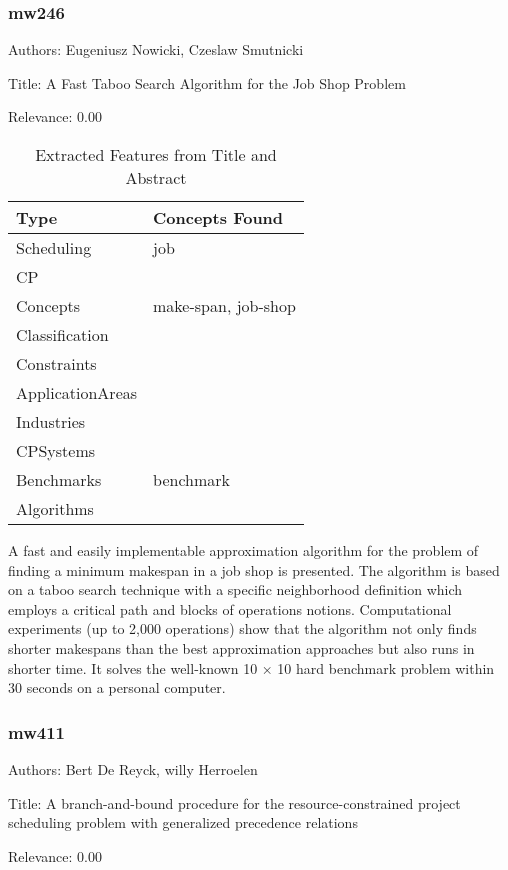 \subsubsection{mw246}
\label{mw:mw246}

Authors: Eugeniusz Nowicki, Czeslaw Smutnicki

Title: A Fast Taboo Search Algorithm for the Job Shop Problem

Relevance:  0.00

{\scriptsize
\begin{longtable}{p{2cm}p{20cm}}
\caption{Extracted Features from Title and Abstract}\\ \toprule
Type & Concepts Found\\ \midrule
\endhead
\bottomrule
\endfoot
Scheduling & job\\ 
CP & \\ 
Concepts & make-span, job-shop\\ 
Classification & \\ 
Constraints & \\ 
ApplicationAreas & \\ 
Industries & \\ 
CPSystems & \\ 
Benchmarks & benchmark\\ 
Algorithms & \\ 
\end{longtable}
}

  A fast and easily implementable approximation algorithm for the problem of finding a minimum makespan in a job shop is presented. The algorithm is based on a taboo search technique with a specific neighborhood definition which employs a critical path and blocks of operations notions. Computational experiments (up to 2,000 operations) show that the algorithm not only finds shorter makespans than the best approximation approaches but also runs in shorter time. It solves the well-known 10 × 10 hard benchmark problem within 30 seconds on a personal computer.  

\subsubsection{mw411}
\label{mw:mw411}

Authors: Bert De Reyck, willy Herroelen

Title: A branch-and-bound procedure for the resource-constrained project scheduling problem with generalized precedence relations

Relevance:  0.00

